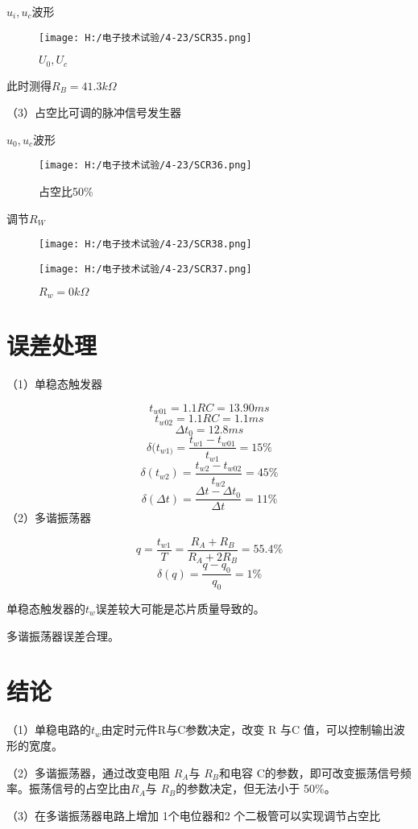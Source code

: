 \documentclass{article}
\begin{document}
  $u_i,u_c$波形
  \begin{figure}[h]
        \centering   
        \texttt{[image: H:/电子技术试验/4-23/SCR35.png]}   
        \caption{$U_0,U_c$}   
        \label{fig:side:a}   
    \end{figure}
\par
此时测得$R_B=41.3k\Omega$
\par
（3）占空比可调的脉冲信号发生器\par
  $u_0,u_c$波形
  \begin{figure}[h]
        \centering   
        \texttt{[image: H:/电子技术试验/4-23/SCR36.png]}   
        \caption{占空比50\%}   
        \label{fig:side:a}   
    \end{figure}

    调节$R_W$
    \begin{figure}[h]
        \begin{minipage}[t]{0.5\linewidth} %
          \centering   
          \texttt{[image: H:/电子技术试验/4-23/SCR38.png]}   
          \caption{$R_w=116.2k\Omega$}   
          \label{fig:side:a}   
        \end{minipage}%
        \begin{minipage}[t]{0.5\linewidth}   
          \centering   
          \texttt{[image: H:/电子技术试验/4-23/SCR37.png]}   
          \caption{$R_w=0k\Omega$}   
          \label{fig:side:b}   
        \end{minipage}   
      \end{figure}
 \section{ 误差处理}
（1）单稳态触发器\par 
\[ t_{w01}=1.1RC=13.90ms \]
\[ t_{w02}=1.1RC=1.1ms \]
\[ \Delta t_0=12.8ms \]
\[ \delta (t_{w1)}=\frac{ t_{w1}- t_{w01}}{t_{w1}}=15\%\]
\[ \delta (t_{w2})=\frac{ t_{w2}- t_{w02}}{t_{w2}}=45\%\]
\[ \delta (\Delta t)=\frac{ \Delta t- \Delta t_0}{\Delta t}=11\%\]
（2）多谐振荡器\par
\[q=\frac{t_{w1}}{T}=\frac{R_A+R_B}{R_A+2R_B}=55.4\%\]
\[\delta (q)=\frac{q-q_0}{q_0}=1\%\]

\par
单稳态触发器的$t_w$误差较大可能是芯片质量导致的。\par
多谐振荡器误差合理。\par
\section{结论}
（1）单稳电路的$t_w$由定时元件R与C参数决定，改变 R 与C 值，可以控制输出波形的宽度。\par
（2）多谐振荡器，通过改变电阻 $R_A$与 $R_B$和电容 C的参数，即可改变振荡信号频率。振荡信号的占空比由$R_A$与 $R_B$的参数决定，但无法小于 
50\%。\par
（3）在多谐振荡器电路上增加 1个电位器和2 个二极管可以实现调节占空比\par
\end{document}
